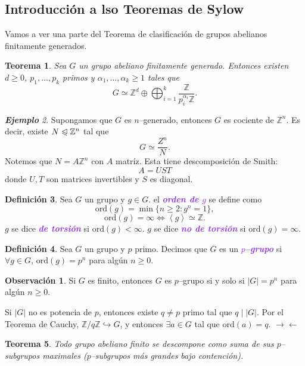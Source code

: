 \documentclass{article}
\newtheorem{theorem}{Teorema}[subsection]
\theoremstyle{definition}
\newtheorem{definition}[theorem]{Definición}
\newtheorem*{obs}{Observación}
\theoremstyle{remark}
\newtheorem{example}[theorem]{\textbf{Ejemplo}}
\numberwithin{equation}{section}
\newcommand{\Z}{\mathbb{Z}}
\newcommand{\oo}{\infty}
\newcommand{\embed}{\hookrightarrow}
\newcommand{\normal}{\trianglelefteqslant}
\newcommand{\ord}{\mathrm{ord}}
\newcommand{\abs}[1]{\left| #1 \right|}
\newcommand{\gen}[1]{\left\langle #1 \right\rangle}
\newcommand{\znz}[1]{\frac{\Z}{#1 \Z}}
\newcommand{\zmz}[1]{\Z/ #1 \Z}
\newcommand{\wea}[1]{\textcolor{BlueViolet}{\textbf{\emph{#1}}}}
\begin{document}
\newpage
\subsection{Introducción a lso Teoremas de Sylow}

Vamos a ver una parte del Teorema de clasificación de grupos abelianos finitamente generados.

\begin{theorem}
  Sea $G$ un grupo abeliano finitamente generado. Entonces existen $d \geq 0$, $p_1,\dots, p_k$ primos y $\alpha_1, \dots, \alpha_k \geq 1$ tales que
  \[G \simeq \Z^d \oplus \bigoplus_{i=1}^k \znz{p_i^{\alpha_i}}.\]
\end{theorem}

\begin{example}
  Supongamos que $G$ es $n$--generado, entonces $G$ es cociente de $\Z^n$. Es decir, existe $N \normal \Z^n$ tal que
  \[G \simeq \frac{Z^n}{N}.\]
  Notemos que $N = A \Z^n$ con $A$ matríz. Esta tiene descomposición de Smith:
  \[A = UST\]
  donde $U,T$ son matrices invertibles y $S$ es diagonal.
\end{example}

\begin{definition}
  Sea $G$ un grupo y $g \in G$. el \wea{orden de $g$} se define como
  \[\ord(g) = \min\{n \geq 2 \colon g^n = 1\},\]
  \[\ord(g) = \oo \iff \gen{g} \simeq \Z.\]
  $g$ se dice \wea{de torsión} si $\ord(g) < \oo$.
  $g$ se dice \wea{no de torsión} si $\ord(g) = \oo$.
\end{definition}

\begin{definition}
  Sea $G$ un grupo y $p$ primo. Decimos que $G$ es un \wea{$p$--grupo} si $\forall g \in G$, $\ord(g) = p^n$ para algún $n \geq 0$.
\end{definition}

\begin{obs}
  Si $G$ es finito, entonces $G$ es $p$--grupo si y solo si $\abs G = p^n$ para algún $n \geq 0$.

  Si $\abs G$ no es potencia de $p$, entonces existe $q \neq p$ primo tal que $q \mid \abs G$. Por el Teorema de Cauchy, $\zmz q \embed G$, y entonces $\exists a \in G$ tal que $\ord(a) = q$. $\to\gets$
\end{obs}

\begin{theorem}
  Todo grupo abeliano finito se descompone como suma de sus $p$--subgrupos maximales ($p$--subgrupos más grandes bajo contención).
\end{theorem}
\end{document}
